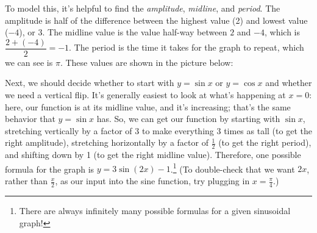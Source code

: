 \documentclass[main]{subfiles}
\begin{document}
\begin{enumerate}[resume]
\begin{enumerate}
    \begin{solution}
      To model this, it's helpful to find the
      \color{red}\emph{amplitude}\color{black},
      \color{green!70!black}\emph{midline}\color{black}, and
      \color{blue}\emph{period}\color{black}.  The amplitude is half of
      the difference between the highest value (2) and lowest value
      ($-4$), or $3$.  The midline value is the value half-way between
      $2$ and $-4$, which is $\dfrac{2 + (-4)}{2} = -1$.  The period is
      the time it takes for the graph to repeat, which we can see is
      $\pi$.  These values are shown in the picture below:
      \begin{center}
      \end{center}
      Next, we should decide whether to start with $y = \sin x$ or $y =
      \cos x$ and whether we need a vertical flip.  It's generally
      easiest to look at what's happening at $x = 0$: here, our function
      is at its midline value, and it's increasing; that's the same
      behavior that $y = \sin x$ has.  So, we can get our function by
      starting with $\sin x$, stretching vertically by a factor of 3 to
      make everything 3 times as tall (to get the right amplitude),
      stretching horizontally by a factor of $\frac{1}{2}$ (to get the
      right period), and shifting down by 1 (to get the right midline
      value).  Therefore, one possible formula for the graph is
      $\boxed{y = 3\sin(2x) -1}$.\footnote{There are always infinitely
        many possible formulas for a given sinusoidal graph!}  (To
      double-check that we want $2x$, rather than $\frac{x}{2}$, as our
      input into the sine function, try plugging in $x=\frac{\pi}{4}$.)


\end{solution}
\end{enumerate}
\end{enumerate}
\end{document}
